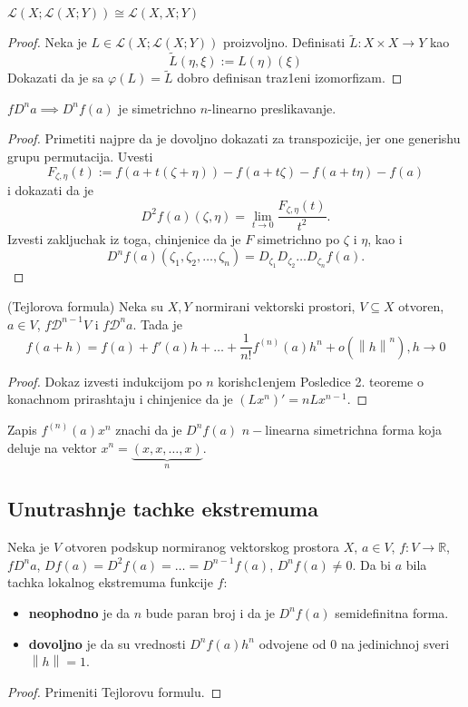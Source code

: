 \documentclass[a4paper,12pt]{article}
\newcommand{\R}{\mathbb{R}}
\newcommand{\psj}{\subseteq}
\newcommand{\norm}[1]{\left\lVert#1\right\rVert}
\begin{document}
\begin{tvr}
$\mathcal{L} (X; \mathcal{L}(X;Y)) \cong \mathcal{L} (X,X; Y)$
\end{tvr}
\begin{proof}
Neka je $L \in \mathcal{L} (X; \mathcal{L}(X;Y))$ proizvoljno. Definisati $\tilde{L} : X \times X \to Y$ kao \[\tilde{L} (\eta, \xi) := L(\eta)(\xi)\]
Dokazati da je sa $\varphi(L) = \tilde{L}$ dobro definisan traz1eni izomorfizam.
\end{proof}

\begin{tvr}
	$fD^n a \implies D^nf(a)$ je simetrichno $n$-linearno preslikavanje.
\end{tvr}
\begin{proof}
	Primetiti najpre da je dovoljno dokazati za transpozicije, jer one generishu grupu permutacija.
	Uvesti \[F_{\zeta, \eta} (t) := f(a +t(\zeta + \eta)) - f(a + t\zeta) - f(a + t\eta) - f(a)\] i 
	dokazati da je \[ D^2f(a)(\zeta, \eta) = \lim_{t\to 0} \dfrac{F_{\zeta, \eta} (t)}{t^2} .\] 
	Izvesti zakljuchak iz toga, chinjenice da je $F$ simetrichno po $\zeta$ i $\eta$, kao i 
	\[ D^nf(a) (\zeta_1, \zeta_2, \dotso, \zeta_n) = D_{\zeta_1}D_{\zeta_2}\dotso D_{\zeta_n} f(a).\]
\end{proof}

\begin{tma}
(Tejlorova formula) Neka su $X, Y$ normirani vektorski prostori, $V \psj X$ otvoren, $a \in V$, $f \mathcal{D}^{n-1}V$ i $f\mathcal{D}^n a$. Tada je 
\[f(a+h) = f(a) + f'(a)h + \dots + \frac{1}{n!} f^{(n)}(a) h^n + o(\norm{h}^n), h \to 0\]
\end{tma}
\begin{proof}
Dokaz izvesti indukcijom po $n$ korish\-c1e\-njem Posledice 2. teoreme o konachnom prirashtaju i chinjenice da je $(Lx^n)' = n Lx^{n-1}$.
\end{proof}

\begin{nap}
	Zapis $f^{(n)}(a) x^n$ znachi da je $D^nf(a)$ $n-$linearna simetrichna forma koja deluje na vektor $x^n = \underbrace{(x, x, \dotso, x)}_{n}$.
\end{nap}

\subsection{Unutrashnje tachke ekstremuma}

\begin{tvr}
	Neka je $V$ otvoren podskup normiranog vektorskog prostora $X$, $a \in V$, $f:V\to \R$, $f D^n a$,
	$Df(a) = D^2f(a) = \dotso = D^{n-1}f(a)$, $D^n f(a) \neq 0 $. Da bi $a$ bila tachka lokalnog ekstremuma
    funkcije $f$:
	\begin{itemize}
		\item \textbf{neophodno} je da $n$ bude paran broj i da je $D^nf(a)$ semidefinitna forma.
		\item \textbf{dovoljno} je da su vrednosti $D^nf(a)h^n$ odvojene od $0$ na jedinichnoj sveri $\norm h = 1$.
	\end{itemize}
\end{tvr}
\begin{proof}
	Primeniti Tejlorovu formulu.
\end{proof}
\end{document}
